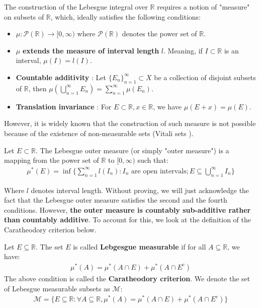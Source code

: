\noindent\newline The construction of the Lebesgue integral over $\mathbb{R}$ requires a notion of "measure" on subsets of $\mathbb{R}$, which, ideally satisfies the following conditions:
\begin{itemize}
    \item $\mu:\mathcal{P}(\mathbb{R}) \to [0, \infty)$ where $\mathcal{P}(\mathbb{R})$ denotes the power set of $\mathbb{R}$.
    \item $\mu$ \textbf{extends the measure of interval length} $l$. Meaning, if $I\subset \mathbb{R}$ is an interval, $\mu(I)=l(I)$.
    \item \textbf{Countable additivity} : Let $\{E_n\}_{n=1}^\infty\subset X$ be a collection of disjoint subsets of $\mathbb{R}$, then $\mu(\bigcup_{n=1}^\infty E_n) = \sum_{n=1}^\infty \mu(E_n)$.
    \item \textbf{Translation invariance} : For $E \subset \mathbb{R}, x\in \mathbb{R}$, we have $\mu(E+x)=\mu(E)$.
\end{itemize}

\noindent However, it is widely known that the construction of such measure is not possible because of the existence of non-measurable sets (Vitali sets \cite{wiki:vitaliset}).

\begin{definition}
    Let $E\subset \mathbb{R}$. The Lebesgue outer measure (or simply "outer measure") is a mapping from the power set of $\mathbb{R}$ to $[0, \infty)$ such that:
    \begin{align*}
        \mu^*(E) = \inf\Bigg\{ \sum_{n=1}^\infty l(I_n) : I_n \text{ are open intervals}; E \subseteq \bigcup_{n=1}^\infty I_n \Bigg\}
    \end{align*}

    \noindent Where $l$ denotes interval length. Without proving, we will just acknowledge the fact that the Lebesgue outer measure satisfies the second and the fourth conditions. However, \textbf{the outer measure is countably sub-additive rather than countably additive}. To account for this, we look at the definition of the Caratheodory criterion below.
\end{definition}

\begin{definition}
    Let $E \subseteq \mathbb{R}$. The set $E$ is called \textbf{Lebgesgue measurable} if for all $A\subseteq \mathbb{R}$, we have:
    \begin{align*}
        \mu^*(A) = \mu^*(A \cap E) + \mu^*(A\cap E^c)
    \end{align*}
    \noindent The above condition is called the \textbf{Caratheodory criterion}. We denote the set of Lebesgue measurable subsets as $\mathcal{M}$:
    \begin{align*}
        \mathcal{M} = \Bigg\{ E \subseteq \mathbb{R} : \forall A \subseteq \mathbb{R}, \mu^*(A) = \mu^*(A \cap E) + \mu^*(A\cap E^c) \Bigg\}
    \end{align*}
\end{definition}

